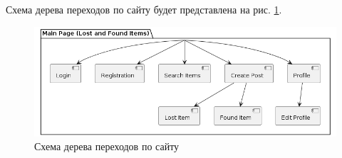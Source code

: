 Схема дерева переходов по сайту будет представлена на рис. \ref{fig:site-tree}.

\begin{figure}[htb]
	\centering
	\includegraphics[width=.9\textwidth]{images/site-tree.png}
	\parskip=6pt
	\caption{Схема дерева переходов по сайту}
	\label{fig:site-tree}
\end{figure}

